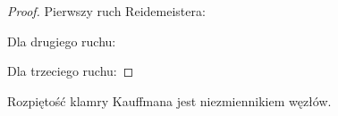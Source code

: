 \begin{proof}
Pierwszy ruch Reidemeistera:
\begin{comment}
\begin{align*}
    \bracket{\MediumReidemeisterIaLeft} & \stackrel{K2}{=} A 
    \bracket{\MediumReidemeisterIaLeftFirstSmoothering} + 
    A^{-1} \bracket{\MediumReidemeisterIaLeftSecondSmoothering} \\ & \stackrel{K3}{=} 
    A \bracket{\MediumReidemeisterIb} + 
    A^{-1}(-A^{-2}-A^2) \bracket{\MediumReidemeisterIb} = 
    -A^{-3}\bracket{\MediumReidemeisterIb}
\end{align*}
\end{comment}

Dla drugiego ruchu:
\begin{comment}
\begin{align*}
    \bracket{\MediumReidemeisterIIa} & \stackrel{K2}{=}
    A \bracket{\MediumReidemeisterIIaSmoothed} +
    A^{-1} \bracket{\MediumLeftCrossingLow} \\ & \stackrel{K1}{=}
    -A^{-2} \bracket{\MediumLeftSmoothing} + 
    A^{-1} \bracket{\MediumLeftCrossingLow} \\ & \stackrel{K2}{=}
    -A^{-2} \bracket{\MediumLeftSmoothing} +
    A^{-1}A \bracket{\MediumRightSmoothing} + 
    A^{-1}A^{-1} \bracket{\MediumLeftSmoothing} \\ & = 
    \bracket{\MediumRightSmoothing}
\end{align*}
\end{comment}

Dla trzeciego ruchu:
\begin{comment}
\begin{align*}
\bracket{\MediumReidemeisterIIIa} & \stackrel{K2}{=}
A \bracket{\MediumReidemeisterIIIb} +
A^{-1} \bracket{\MediumReidemeisterIIIc} \stackrel{R2}{=} 
A \bracket{\MediumReidemeisterIIId} +
A^{-1} \bracket{\MediumReidemeisterIIIe} \\ & \stackrel{R2}{=}
A \bracket{\MediumReidemeisterIIIbFlipped} +
A^{-1} \bracket{\MediumReidemeisterIIIcFlipped} \stackrel{K2}{=} 
\bracket{\MediumReidemeisterIIIaFlipped},
\end{align*}
korzystaliśmy tu z~własności drugiego ruchu.
\end{comment}
\end{proof}

\begin{corollary}
    Rozpiętość klamry Kauffmana jest niezmiennikiem węzłów.
\end{corollary}

